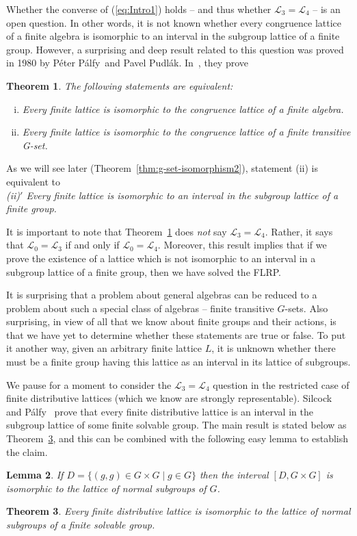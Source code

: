 \documentclass[cm,dissertation]{uhthesis}
\theoremstyle{plain}
\newtheorem{theorem}{Theorem}[section]
\newtheorem{lemma}[theorem]{Lemma}
\theoremstyle{definition}
\newcounter{claim}
\theoremstyle{remark}
\numberwithin{theorem}{section}
\numberwithin{claim}{chapter}
\numberwithin{equation}{section}
\numberwithin{conjecture}{chapter}
\newcommand{\Palfy}{P\'alfy}
\newcommand{\Pudlak}{Pudl\'ak}
\newcommand{\<}{\ensuremath{\langle}}
\renewcommand{\>}{\ensuremath{\rangle}}
\newcommand{\FLRP}{{\small FLRP}}
\newcommand{\0}{\ensuremath{\mathbf{0}}}
\newcommand{\1}{\ensuremath{\mathbf{1}}}
\newcommand{\2}{\ensuremath{\mathbf{2}}}
\newcommand{\3}{\ensuremath{\mathbf{3}}}
\newcommand{\4}{\ensuremath{\mathbf{4}}}
\newcommand{\5}{\ensuremath{\mathbf{5}}}
\newcommand{\sL}{\ensuremath{\mathscr{L}}}
\begin{document}
Whether the converse of (\ref{eq:Intro1}) holds -- and thus whether 
$\sL_3 = \sL_4$ -- is an open question.  In other words, it is not known whether
every congruence lattice of a finite algebra is isomorphic to an interval in the
subgroup lattice of a finite group.
However, a surprising and deep result related to this question was proved in
1980 by 
%
%
P\'eter \Palfy\ and Pavel \Pudlak.
In~\cite{Palfy:1980}, they prove 
\begin{theorem}
\label{thm:IntroP5}
The following statements are equivalent:
\begin{enumerate}[(i)]
\item Every finite lattice is isomorphic to
  the congruence lattice of a finite algebra.
\item Every finite lattice is isomorphic to the congruence lattice of a finite transitive G-set.
\end{enumerate}
\end{theorem}
As we will see later (Theorem~\ref{thm:g-set-isomorphism2}), statement (ii) is equivalent to
\\[4pt]
{\it (ii)${}'$ Every finite lattice is isomorphic to an interval in the subgroup lattice of a finite group.}

It is important to note that Theorem~\ref{thm:IntroP5} does \emph{not} say
$\sL_3 = \sL_4$.  Rather, it says that $\sL_0 = \sL_3$ if and only if
$\sL_0=\sL_4$.  Moreover, this result implies that if we prove the existence of a lattice
which is not isomorphic to an interval in a subgroup lattice of a finite group,
then we have solved the \FLRP. 

It is surprising that a problem about general algebras can be reduced to
a problem about such a special class of algebras -- finite transitive
$G$-sets.  Also surprising, in view of all that we know about 
finite groups and their actions, is that we have
yet to determine whether these statements are true or false.
To put it another way, given an arbitrary finite lattice $L$, 
it is unknown whether there must be a finite group having this lattice as an
interval in its lattice of subgroups.  

%
We pause for a moment to consider the $\sL_3 = \sL_4$ question in the restricted 
case of finite distributive lattices (which we know are strongly
representable).  
Silcock~\cite{Silcock:1977} and \Palfy~\cite{Palfy:1987} prove that 
every finite distributive lattice is an interval in the subgroup lattice of some
finite solvable group.  The main result is stated below as
Theorem~\ref{thm:diag-normals}, and this can be combined with the
following easy lemma to establish the claim. 
\begin{lemma}
\label{lem:diag-normals}
If $D = \{(g,g) \in G \times G \mid g\in G\}$ then the interval $[D, G \times G]$ is isomorphic to the
lattice of normal subgroups of $G$.
\end{lemma}
\begin{theorem}
\label{thm:diag-normals}
Every finite distributive lattice is isomorphic to the lattice of normal subgroups
of a finite solvable group.
\end{theorem}
\end{document}

